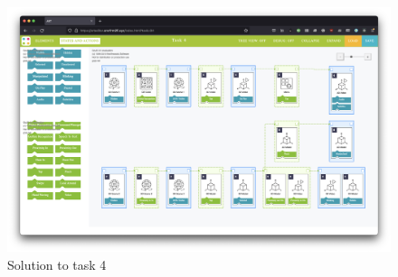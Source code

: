 \begin{figure}[h]
    \centering
    \includegraphics[width=\linewidth]{Figures/Evaluation/Tasks/task4-sol.png}
    \caption{Solution to task 4}
    \label{fig:task4-sol}
\end{figure}